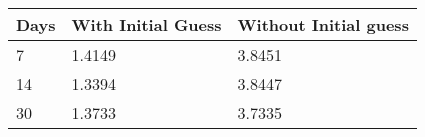 \begin{tabular}{lll}
Days & With Initial Guess & Without Initial guess \\ 
\hline 
7 & 1.4149 & 3.8451 \\ 
14 & 1.3394 & 3.8447 \\ 
30 & 1.3733 & 3.7335 \\ 
\hline 
\end{tabular}
